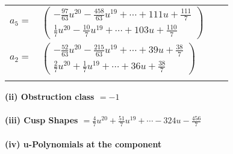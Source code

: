 \documentclass[1p]{elsarticle_modified}
\theoremstyle{definition}
\begin{document}
\begin{tabular}{m{7pt} m{180pt} m{7pt} m{180pt} }
\flushright $a_{5}=$&$\begin{pmatrix}-\frac{97}{63} u^{20}-\frac{458}{63} u^{19}+\cdots+111 u+\frac{111}{7}\\\frac{1}{7} u^{20}-\frac{10}{7} u^{19}+\cdots+103 u+\frac{110}{7}\end{pmatrix}$ \\
\flushright $a_{2}=$&$\begin{pmatrix}-\frac{52}{63} u^{20}-\frac{215}{63} u^{19}+\cdots+39 u+\frac{38}{7}\\\frac{2}{7} u^{20}+\frac{1}{7} u^{19}+\cdots+36 u+\frac{38}{7}\end{pmatrix}$\\&\end{tabular}
\flushleft \textbf{(ii) Obstruction class $= -1$}\\~\\
\flushleft \textbf{(iii) Cusp Shapes $= \frac{4}{7} u^{20}+\frac{51}{7} u^{19}+\cdots-324 u-\frac{456}{7}$}\\~\\
\newpage\renewcommand{\arraystretch}{1}
\flushleft \textbf{(iv) u-Polynomials at the component}\newline \\
\end{document}
